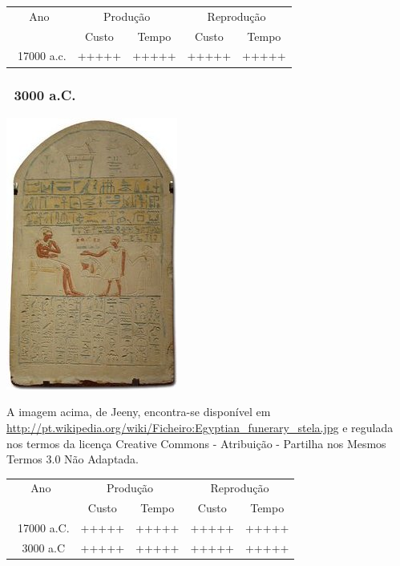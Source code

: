 \documentclass[]{beamer}
\begin{document}
\begin{frame}[t]
    \begin{center}
        \begin{tabular}{|c|c|c|c|c|}
            \hline
            Ano & \multicolumn{2}{|c|}{Produ\c{c}\~{a}o} & \multicolumn{2}{|c|}{Reprodu\c{c}\~{a}o} \\ \cline{2-5}
            & Custo & Tempo & Custo & Tempo \\ \hline
            ~17000 a.c. & +++++ & +++++ & +++++ & +++++  \\ \hline
        \end{tabular}
    \end{center}
\end{frame}

\begin{frame}
    \frametitle{~3000 a.C.}
    \begin{center}
        \includegraphics[height=0.6\textheight]{pictures/egyptian_funerary_stela.jpg}
    \end{center}

    \begin{tiny}
        A imagem acima, de Jeeny, encontra-se dispon\'{i}vel em \url{http://pt.wikipedia.org/wiki/Ficheiro:Egyptian_funerary_stela.jpg} e regulada nos termos da licen\c{c}a Creative Commons - Atribui\c{c}\~{a}o - Partilha nos Mesmos Termos 3.0 N\~{a}o Adaptada.
    \end{tiny}
\end{frame}

\begin{frame}[t]
    \begin{center}
        \begin{tabular}{|c|c|c|c|c|}
            \hline
            Ano & \multicolumn{2}{|c|}{Produ\c{c}\~{a}o} & \multicolumn{2}{|c|}{Reprodu\c{c}\~{a}o} \\ \cline{2-5}
            & Custo & Tempo & Custo & Tempo \\ \hline
            ~17000 a.C. & +++++ & +++++ & +++++ & +++++  \\ \hline
            ~3000 a.C & +++++ & +++++ & +++++ & +++++ \\ \hline
        \end{tabular}
    \end{center}
\end{frame}
\end{document}
